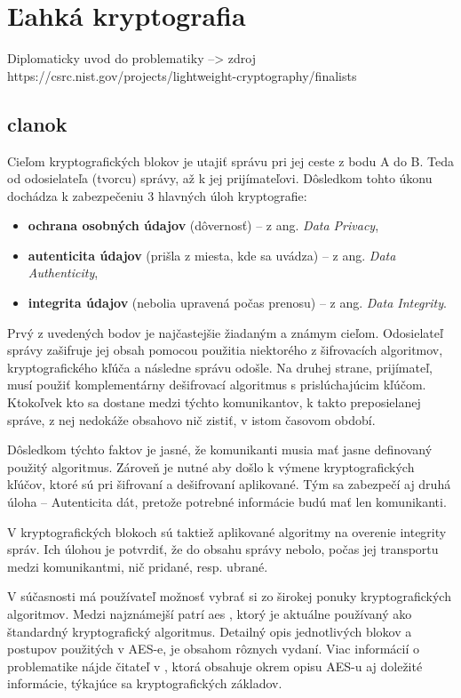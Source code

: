 \chapter{Ľahká kryptografia}\label{krypto}
Diplomaticky uvod do problematiky --> zdroj \\
https://csrc.nist.gov/projects/lightweight-cryptography/finalists 

\section{clanok}
Cieľom kryptografických blokov je utajiť správu pri jej ceste z bodu A do B. Teda od odosielateľa (tvorcu) správy, až k jej prijímateľovi. Dôsledkom tohto úkonu dochádza k zabezpečeniu 3 hlavných úloh kryptografie:
\begin{itemize}
	\item \textbf{ochrana osobných údajov} (dôvernosť) -- z ang. \textit{Data Privacy}, 
	\item \textbf{autenticita údajov} (prišla z miesta, kde sa uvádza)  -- z ang. \textit{Data Authenticity},
	\item \textbf{integrita údajov} (nebolia upravená počas prenosu)  -- z ang. \textit{Data Integrity}.
\end{itemize}

 Prvý z uvedených bodov je najčastejšie žiadaným a známym cieľom. Odosielateľ správy zašifruje jej obsah pomocou použitia niektorého z šifrovacích algoritmov, kryptografického kľúča a následne správu odošle. Na druhej strane, prijímateľ, musí použiť komplementárny dešifrovací algoritmus s prislúchajúcim kľúčom. Ktokoľvek kto sa dostane medzi týchto komunikantov, k takto preposielanej správe, z nej nedokáže obsahovo nič zistiť, v istom časovom období. 
 
 Dôsledkom týchto faktov je jasné, že komunikanti musia mať jasne definovaný použitý algoritmus. Zároveň je nutné aby došlo k výmene kryptografických kľúčov, ktoré sú pri šifrovaní a dešifrovaní aplikované. Tým sa zabezpečí aj druhá úloha -- Autenticita dát, pretože potrebné informácie budú mať len komunikanti. 
 
 V kryptografických blokoch sú taktiež aplikované algoritmy na overenie integrity správ. Ich úlohou je potvrdiť, že do obsahu správy nebolo, počas jej transportu medzi komunikantmi, nič pridané, resp. ubrané.
 
 V súčasnosti má používateľ možnosť vybrať si zo širokej ponuky kryptografických algoritmov. Medzi najznámejší patrí \acrshort{aes} \cite{aes}, ktorý je aktuálne používaný ako štandardný kryptografický algoritmus. Detailný opis jednotlivých blokov a postupov použitých v AES-e, je obsahom rôznych vydaní. Viac informácií o problematike nájde čitateľ v \cite{levicky}, ktorá obsahuje okrem opisu AES-u aj doležité informácie, týkajúce sa kryptografických základov.

